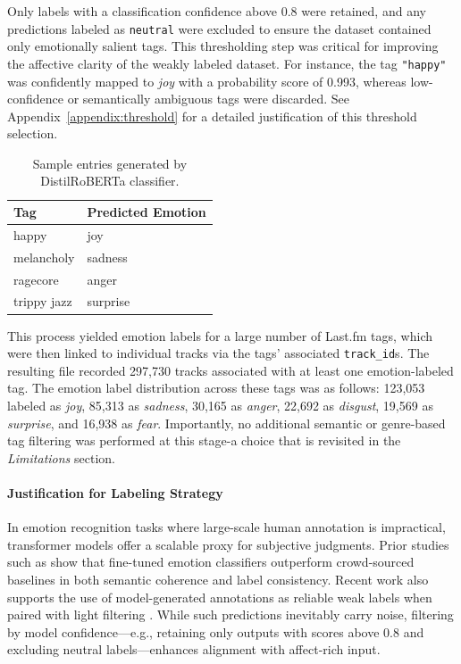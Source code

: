 \documentclass{article}
\begin{document}

Only labels with a classification confidence above 0.8 were retained, and any predictions labeled as \texttt{neutral} were excluded to ensure the dataset contained only emotionally salient tags. This thresholding step was critical for improving the affective clarity of the weakly labeled dataset. For instance, the tag \texttt{"happy"} was confidently mapped to \textit{joy} with a probability score of 0.993, whereas low-confidence or semantically ambiguous tags were discarded. See Appendix~\ref{appendix:threshold} for a detailed justification of this threshold selection.

\begin{table}[H]
\centering
\begin{tabular}{|l|l|}
\hline
\textbf{Tag} & \textbf{Predicted Emotion} \\
\hline
happy & joy \\
melancholy & sadness \\
ragecore & anger \\
trippy jazz & surprise \\
\hline
\end{tabular}
\caption{Sample entries generated by DistilRoBERTa classifier.}
\end{table}

This process yielded emotion labels for a large number of Last.fm tags, which were then linked to individual tracks via the tags' associated \texttt{track\_id}s. The resulting file recorded 297,730 tracks associated with at least one emotion-labeled tag. The emotion label distribution across these tags was as follows: 123,053 labeled as \textit{joy}, 85,313 as \textit{sadness}, 30,165 as \textit{anger}, 22,692 as \textit{disgust}, 19,569 as \textit{surprise}, and 16,938 as \textit{fear}. Importantly, no additional semantic or genre-based tag filtering was performed at this stage-a choice that is revisited in the \textit{Limitations} section.

\paragraph{Justification for Labeling Strategy} In emotion recognition tasks where large-scale human annotation is impractical, transformer models offer a scalable proxy for subjective judgments. Prior studies such as \textcite{Hartman2022} show that fine-tuned emotion classifiers outperform crowd-sourced baselines in both semantic coherence and label consistency. Recent work also supports the use of model-generated annotations as reliable weak labels when paired with light filtering \parencite{Artemova2025, Kim2024}. While such predictions inevitably carry noise, filtering by model confidence—e.g., retaining only outputs with scores above 0.8 and excluding neutral labels—enhances alignment with affect-rich input.
\end{document}
